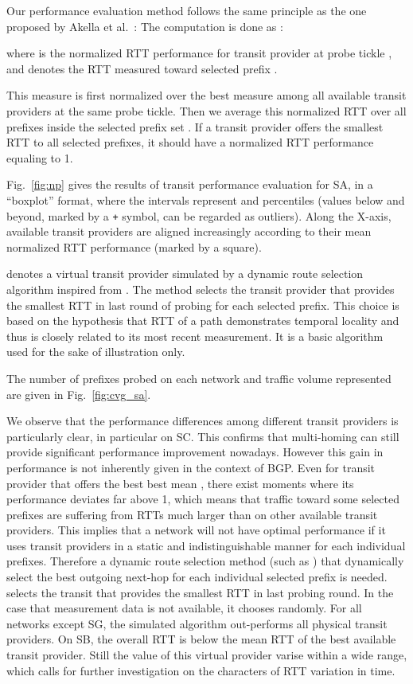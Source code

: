 \documentclass[10pt, conference,letterpaper]{IEEEtran}
\begin{document}
Our performance evaluation method follows the same principle as the one proposed by Akella et al.\ \cite{Akella2003a}: The computation is done as :

where  is the normalized RTT performance for transit provider  at probe tickle , and 
 denotes the RTT measured toward selected prefix .

This measure is first normalized over the best measure among all available transit providers  at the same probe tickle.
Then we average this normalized RTT over all prefixes inside the selected prefix set .
If a transit provider offers the smallest RTT to all selected prefixes, it should have a normalized RTT performance equaling to 1.

Fig.~\ref{fig:np} gives the results of transit performance evaluation for SA, in a ``boxplot'' format, where the intervals represent  and  percentiles (values below and beyond, marked by a \texttt{+} symbol, can be regarded as outliers).
Along the X-axis, available transit providers are aligned increasingly according to their mean normalized RTT performance (marked by a square). 

 denotes a virtual transit provider simulated by a dynamic route selection algorithm inspired from \cite{Akella2008}. The method selects the transit provider that provides the smallest RTT in last round of probing for each selected prefix. This choice is  based on the hypothesis that RTT of a path demonstrates temporal locality and thus is  closely related to its most recent measurement.
It is a basic algorithm used for the sake of illustration only.

The number of prefixes probed on each network and traffic volume represented are given in Fig.~\ref{fig:cvg_sa}. 


We observe that the performance differences among different transit providers is particularly clear, in particular on SC.
This confirms that multi-homing can still provide significant performance improvement nowadays. 
However this gain in performance is not inherently given in the context of BGP.
Even for transit provider that offers the best best mean , there exist moments where its performance deviates far above 1, which means that traffic toward some selected prefixes are suffering from RTTs much larger than on other available transit providers.
This implies that a network will not have optimal  performance if it uses transit providers in a static and indistinguishable manner for each individual prefixes.
Therefore a dynamic route selection  method (such as ) that dynamically select the best outgoing next-hop for each individual selected prefix is needed. 
 selects the transit that provides the smallest RTT in last probing round. 
In the case that measurement data is not available, it chooses randomly. 
For all networks except SG, the simulated algorithm out-performs all physical transit providers.
On SB, the overall RTT is  below the mean RTT of the best available transit provider.
Still the  value of this virtual provider varise within a wide range, which calls for further investigation on the characters of RTT variation in time.
\end{document}
